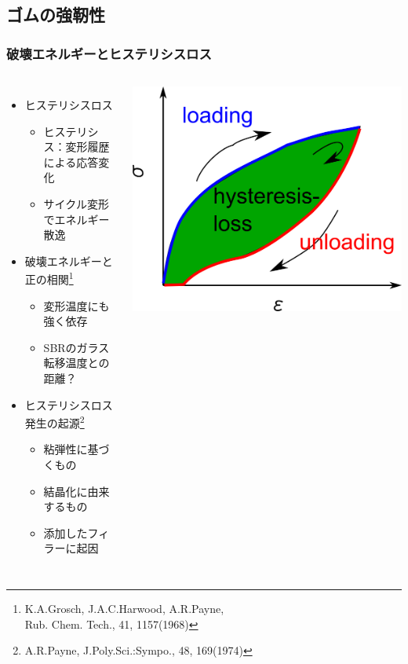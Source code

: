 \documentclass[aspectratio=169,11pt, dvipdfmx]{beamer}
\begin{document}
\subsection{ゴムの強靭性}
\begin{frame}
	\frametitle{破壊エネルギーとヒステリシスロス}
	\vspace{-1mm}
			\begin{columns}[T, onlytextwidth]
					\begin{itemize}
						\item ヒステリシスロス
							\begin{itemize}
								\item ヒステリシス：変形履歴による応答変化
								\item サイクル変形でエネルギー散逸
							\end{itemize}
						\item 破壊エネルギーと\alert{正の相関}\footnote{
								\scriptsize{K.A.Grosch, J.A.C.Harwood, A.R.Payne, \\Rub. Chem. Tech., 41, 1157(1968)}
							}
							\begin{itemize}
								\item \alert{変形温度}にも強く依存
								\item SBRのガラス転移温度との距離？
							\end{itemize}
						\item ヒステリシスロス発生の起源\footnote{
							\scriptsize{A.R.Payne, J.Poly.Sci.:Sympo., 48, 169(1974)}
						}
						\begin{itemize}
							\item \alert{粘弾性に基づくもの}
							\color{blue}
							\item 結晶化に由来するもの
							\item 添加したフィラーに起因
						\end{itemize}
					\end{itemize}
                    \centering
					\includegraphics[width=.72\textwidth]{hysteresis_curve.png}


\end{columns}
\end{frame}
\end{document}
